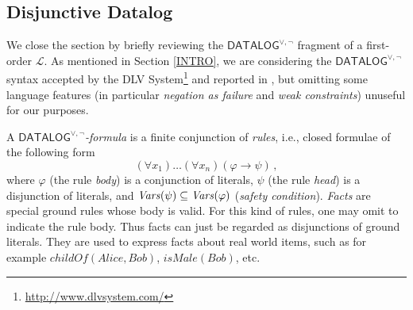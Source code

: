 \documentclass[a4paper]{llncs}
\newcommand{\DisjDatalog}{\ensuremath{\mathsf{DATALOG}^{\vee,\neg}}\xspace}
\newcommand{\Lang}{\ensuremath{\mathcal{L}\xspace}} %
\begin{document}
\subsection{Disjunctive Datalog}

We close the section by briefly reviewing the \DisjDatalog 
fragment of a first-order $\Lang$. As mentioned in Section \ref{INTRO}, we are
considering the \DisjDatalog syntax accepted by
the DLV System\footnote{\url{http://www.dlvsystem.com/}} and reported
in \cite{LeoPfeFabEitGotPerSca2006}, but omitting some language features (in
particular \emph{negation as failure} and \emph{weak constraints}) unuseful for
our purposes.

A \emph{\DisjDatalog-formula} is a finite conjunction of \emph{rules}, i.e.,
closed formulae of the following form
\[
  (\forall x_1)\ldots(\forall x_n)(\varphi \rightarrow \psi)\,, \]
%
where $\varphi$ (the rule \emph{body}) is a conjunction of literals,
$\psi$ (the rule \emph{head}) is a disjunction of literals, and
$\mathit{Vars}(\psi) \subseteq \mathit{Vars}(\varphi)$ (\emph{safety 
condition}).
\emph{Facts} are special ground rules whose body is valid.  For
this kind of rules, one may omit to indicate the rule body.  Thus
facts can just be regarded as disjunctions of ground literals.  They
are used to express facts about real world items, such as for example
$\mathit{childOf}(\mathit{Alice}, \mathit{Bob})$, 
$\mathit{isMale}(\mathit{Bob})$, etc.
\end{document}
